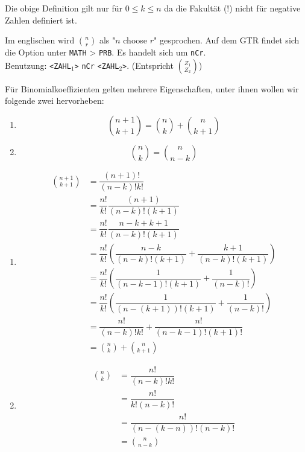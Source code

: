 \documentclass[../MAIN/main.tex]{subfiles}
\begin{document}
\begin{Bemerkung}
  Die obige Definition gilt nur für $0 \leq k \leq n$ da die Fakultät ($!$) nicht für negative Zahlen definiert ist.
\end{Bemerkung}

\begin{GTR-Tipp}
  Im englischen wird ${n \choose r}$ als "$n$ choose $r$" gesprochen. Auf dem GTR findet sich die Option unter \texttt{MATH} > \texttt{PRB}. Es handelt sich um \texttt{nCr}.\\
  Benutzung: \texttt{<ZAHL$_1$>} \texttt{nCr} \texttt{<ZAHL$_2$>}. (Entspricht ${Z_1 \choose Z_2}$)
\end{GTR-Tipp}

\begin{Theorem}
  Für Binomialkoeffizienten gelten mehrere Eigenschaften, unter ihnen wollen wir folgende zwei hervorheben:
  \begin{enumerate}
    \item $${n+1 \choose k+1} = {n \choose k}+{n \choose k+1}$$
    \item $${n \choose k} = {n \choose n-k}$$
  \end{enumerate}
\end{Theorem}
\begin{Beweis}
  \begin{enumerate}
    \item \begin{align*}
      {n+1 \choose k+1} &= \dfrac{(n+1)!}{(n-k)!k!}\\
      &= \dfrac{n!}{k!}\dfrac{(n+1)}{(n-k)!(k+1)}\\
      &= \dfrac{n!}{k!}\dfrac{n-k+k+1}{(n-k)!(k+1)}\\
      &= \dfrac{n!}{k!}  \left( \dfrac{n-k}{(n-k)!(k+1)}+\dfrac{k+1}{(n-k)!(k+1)} \right)\\
      &= \dfrac{n!}{k!}  \left( \dfrac{1}{(n-k-1)!(k+1)}+\dfrac{1}{(n-k)!} \right)\\
      &= \dfrac{n!}{k!}  \left( \dfrac{1}{(n-(k+1))!(k+1)}+\dfrac{1}{(n-k)!} \right)\\
      &= \dfrac{n!}{(n-k)!k!}  + \dfrac{n!}{(n-k-1)!(k+1)!}\\
      &= {n \choose k}+{n \choose k+1}
      \end{align*}
    \item \begin{align*}
      {n \choose k}  &= \dfrac{n!}{(n-k)!k!}\\
      &= \dfrac{n!}{k!(n-k)!}\\
      &= \dfrac{n!}{(n-(k-n))!(n-k)!}\\
      &= {n \choose n-k}
    \end{align*}
  \end{enumerate}
\end{Beweis}
\end{document}
